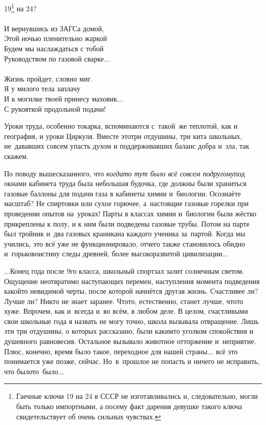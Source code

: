 {\hspace*{2.7cm}19\footnote{Гаечные ключи 19 на 24 в СССР не изготавливались и, следовательно, могли быть только импортными, а посему факт дарения девушке такого ключа свидетельствует об очень сильных чувствах.} на 24?\\
\\
\hspace*{2.7cm}И вернувшись из ЗАГСа домой,\\
\hspace*{2.7cm}Этой ночью пленительно жаркой\\
\hspace*{2.7cm}Будем мы наслаждаться с тобой\\
\hspace*{2.7cm}Руководством по газовой сварке$\ldots$\\
\\
\hspace*{2.7cm}Жизнь пройдет, словно миг.\\
\hspace*{2.7cm}Я у милого тела заплачу\\
\hspace*{2.7cm}И к могилке твоей принесу маховик$\ldots$\\
\hspace*{2.7cm}С рукояткой продольной подачи!\\ 
}
\vspace{0.1cm}

Уроки труда, особенно токарка, вспоминаются с~такой~же теплотой, как и география, и уроки Циркуля. Вместе это\mdash три отдушины, три кита школьных, не~дававших совсем упасть духом и поддерживавших баланс добра и~зла, так скажем. 

По поводу вышесказанного, что \textit{когда\sdash то тут было всё совсем по\sdash другому}\mdash под окнами кабинета труда была небольшая будочка, где должны были храниться газовые баллоны для подачи газа в кабинеты химии и~биологии. Осознаёте масштаб? Не спиртовки или сухое горючее, а~настоящие газовые горелки при проведении опытов на~уроках! Парты в классах химии и~биологии были жёстко прикреплены к полу, и к ним были подведены газовые трубы. Потом на парте был тройник и~два газовых краника\mdash на каждого ученика за~партой. Когда мы учились, это всё уже не функционировало, отчего также становилось обидно и~горько\mdash воистину следы древней, более высокоразвитой цивилизации$\ldots$

$\ldots$Конец года после 9\sdash го класса, школьный спортзал залит солнечным светом. Ощущение неотвратимо наступающих перемен, наступления момента подведения какой\sdash то невидимой черты, после которой начнётся другая жизнь. Счастливее ли? Лучше ли? Никто не знает заранее. Что\sdash то, естественно, станет лучше, что\sdash то хуже. Впрочем, как и~всегда и~во всём, в любом деле. В целом, счастливыми свои школьные года я назвать не могу точно, школа вызывала отвращение. Лишь эти три отдушины, о которых рассказано, были каким\sdash то уголком спокойствия и душевного равновесия. Остальное вызывало животное отторжение и~неприятие. Плюс, конечно, время было такое, переходное для нашей страны$\ldots$ всё это понимается уже позже, сейчас. Но~в~прошлое не попасть и ничего не исправить, что было\mdash то~было$\ldots$  

\begin{center}
\end{center}